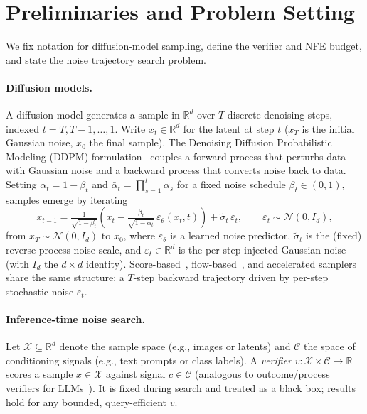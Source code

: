 \section{Preliminaries and Problem Setting}
\label{sec:preliminaries}

We fix notation for diffusion-model sampling, define the verifier and NFE budget, and state the noise trajectory search problem.

\paragraph{Diffusion models.}
A diffusion model generates a sample in $\mathbb{R}^d$ over $T$ discrete denoising steps, indexed $t = T, T-1, \dots, 1$. Write $x_t \in \mathbb{R}^d$ for the latent at step $t$ ($x_T$ is the initial Gaussian noise, $x_0$ the final sample). The Denoising Diffusion Probabilistic Modeling (DDPM) formulation~\citep{ho2020denoising} couples a forward process that perturbs data with Gaussian noise and a backward process that converts noise back to data. Setting $\alpha_t = 1-\beta_t$ and $\bar{\alpha}_t = \prod_{s=1}^{t}\alpha_s$ for a fixed noise schedule $\beta_t\in(0,1)$, samples emerge by iterating
\begin{equation}
  x_{t-1}
  = \tfrac{1}{\sqrt{1 - \beta_t}}\!\left(x_t - \tfrac{\beta_t}{\sqrt{1 - \bar{\alpha}_t}}\,\varepsilon_\theta(x_t, t)\right) + \tilde\sigma_t\,\varepsilon_t,
  \qquad \varepsilon_t\sim\mathcal{N}(0, I_d),
  \label{eq:ddpm-reverse}
\end{equation}
from $x_T\sim\mathcal{N}(0, I_d)$ to $x_0$, where $\varepsilon_\theta$ is a learned noise predictor, $\tilde\sigma_t$ is the (fixed) reverse-process noise scale, and $\varepsilon_t \in \mathbb{R}^d$ is the per-step injected Gaussian noise (with $I_d$ the $d{\times}d$ identity). Score-based~\citep{song2019generative}, flow-based~\citep{lipman2023flow,liu2023flow}, and accelerated samplers~\citep{song2021ddim,lu2022dpm} share the same structure: a $T$-step backward trajectory driven by per-step stochastic noise $\varepsilon_t$.

\paragraph{Inference-time noise search.}

\begin{definition}[Verifier]
\label{def:verifier}
Let $\mathcal{X} \subseteq \mathbb{R}^d$ denote the sample space (e.g., images or latents) and $\mathcal{C}$ the space of conditioning signals (e.g., text prompts or class labels). A \emph{verifier} $v : \mathcal{X} \times \mathcal{C} \to \mathbb{R}$ scores a sample $x \in \mathcal{X}$ against signal $c \in \mathcal{C}$ (analogous to outcome/process verifiers for LLMs~\citep{cobbe2021gsm8k,lightman2023verify}). It is fixed during search and treated as a black box; results hold for any bounded, query-efficient $v$.
\end{definition}


